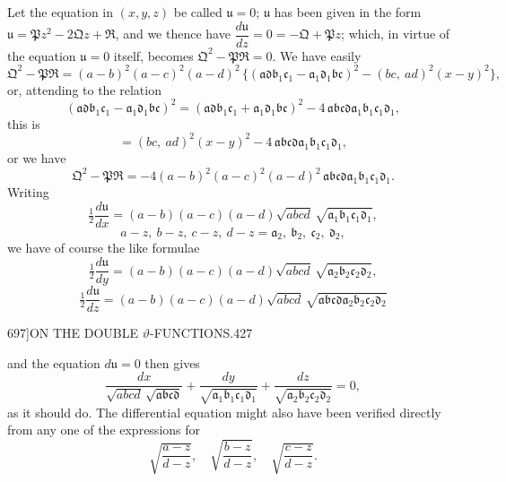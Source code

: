 \documentclass[11pt]{article}
\begin{document}
Let the equation in $(x, y, z)$ be called $\mathfrak{u} = 0$; $\mathfrak{u}$ has been given in the form $\mathfrak{u} = \mathfrak{P} z^{2} - 2\mathfrak{Q} z + \mathfrak{R}$, and we thence have $\dfrac{d\mathfrak{u}}{dz} = 0 = -\mathfrak{Q} + \mathfrak{P} z$; which, in virtue of the equation $\mathfrak{u} = 0$ itself, becomes $\mathfrak{Q}^{2} - \mathfrak{P}\mathfrak{R} = 0$. We have easily
\[ \mathfrak{Q}^{2} - \mathfrak{P}\mathfrak{R} = (a-b)^{2}(a-c)^{2}(a-d)^{2}\,\{(\mathfrak{a}\mathfrak{d}\mathfrak{b}_{1}\mathfrak{c}_{1} - \mathfrak{a}_{1}\mathfrak{d}_{1}\mathfrak{b}\mathfrak{c})^{2} - (bc,\ ad)^{2}(x-y)^{2}\}, \]
or, attending to the relation
\[ (\mathfrak{a}\mathfrak{d}\mathfrak{b}_{1}\mathfrak{c}_{1} - \mathfrak{a}_{1}\mathfrak{d}_{1}\mathfrak{b}\mathfrak{c})^{2} = (\mathfrak{a}\mathfrak{d}\mathfrak{b}_{1}\mathfrak{c}_{1} + \mathfrak{a}_{1}\mathfrak{d}_{1}\mathfrak{b}\mathfrak{c})^{2} - 4\,\mathfrak{a}\mathfrak{b}\mathfrak{c}\mathfrak{d}\mathfrak{a}_{1}\mathfrak{b}_{1}\mathfrak{c}_{1}\mathfrak{d}_{1}, \]
this is
\[ = (bc,\ ad)^{2}(x-y)^{2} - 4\,\mathfrak{a}\mathfrak{b}\mathfrak{c}\mathfrak{d}\mathfrak{a}_{1}\mathfrak{b}_{1}\mathfrak{c}_{1}\mathfrak{d}_{1}, \]
or we have
\[ \mathfrak{Q}^{2} - \mathfrak{P}\mathfrak{R} = -4(a-b)^{2}(a-c)^{2}(a-d)^{2}\,\mathfrak{a}\mathfrak{b}\mathfrak{c}\mathfrak{d}\mathfrak{a}_{1}\mathfrak{b}_{1}\mathfrak{c}_{1}\mathfrak{d}_{1}. \]
Writing
\[ \tfrac{1}{2}\dfrac{d\mathfrak{u}}{dx} = (a-b)(a-c)(a-d)\sqrt{abcd}\,\sqrt{\mathfrak{a}_{1}\mathfrak{b}_{1}\mathfrak{c}_{1}\mathfrak{d}_{1}}, \]
\[ a-z,\ b-z,\ c-z,\ d-z = \mathfrak{a}_{2},\ \mathfrak{b}_{2},\ \mathfrak{c}_{2},\ \mathfrak{d}_{2}, \]
we have of course the like formulae
\[ \tfrac{1}{2}\dfrac{d\mathfrak{u}}{dy} = (a-b)(a-c)(a-d)\sqrt{abcd}\,\sqrt{\mathfrak{a}_{2}\mathfrak{b}_{2}\mathfrak{c}_{2}\mathfrak{d}_{2}}, \]
\[ \tfrac{1}{2}\dfrac{d\mathfrak{u}}{dz} = (a-b)(a-c)(a-d)\sqrt{abcd}\,\sqrt{\mathfrak{a}\mathfrak{b}\mathfrak{c}\mathfrak{d}\mathfrak{a}_{2}\mathfrak{b}_{2}\mathfrak{c}_{2}\mathfrak{d}_{2}} \]

\clearpage
\begin{center}\small 697]\hfill ON THE DOUBLE $\vartheta$-FUNCTIONS.\hfill 427\end{center}

and the equation $d\mathfrak{u} = 0$ then gives
\[ \frac{dx}{\sqrt{abcd}\,\sqrt{\mathfrak{a}\mathfrak{b}\mathfrak{c}\mathfrak{d}}} + \frac{dy}{\sqrt{\mathfrak{a}_{1}\mathfrak{b}_{1}\mathfrak{c}_{1}\mathfrak{d}_{1}}} + \frac{dz}{\sqrt{\mathfrak{a}_{2}\mathfrak{b}_{2}\mathfrak{c}_{2}\mathfrak{d}_{2}}} = 0, \]
as it should do. The differential equation might also have been verified directly from any one of the expressions for
\[ \sqrt{\frac{a-z}{d-z}},\quad \sqrt{\frac{b-z}{d-z}},\quad \sqrt{\frac{c-z}{d-z}}. \]
\end{document}
